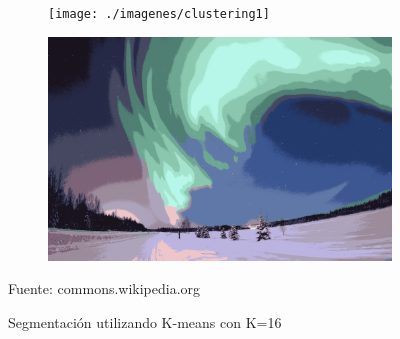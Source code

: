 \begin{figure}[H]
	\captionsetup{justification=centering}
	\centering
	\begin{subfigure}[t]{2.5in}
		\centering
		\texttt{[image: ./imagenes/clustering1]}
		\label{clustering1}
	\end{subfigure}
	\begin{subfigure}[t]{2.5in}
		\centering
		\includegraphics[width=.9\textwidth]{./imagenes/clustering2}
		\label{clustering2}
	\end{subfigure}
	\caption{Segmentaci\'{o}n utilizando K-means con K=16}
	\vspace{2 mm}
	\label{clusteringTotal1}			
	Fuente: commons.wikipedia.org
\end{figure}
